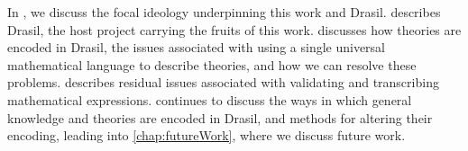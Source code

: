 In , we discuss the focal ideology underpinning this work
and Drasil.  describes Drasil, the host project carrying the
fruits of this work.  discusses how theories are encoded
in Drasil, the issues associated with using a single universal mathematical
language to describe theories, and how we can resolve these problems.
 describes residual issues associated with validating and
transcribing mathematical expressions.  continues to
discuss the ways in which general knowledge and theories are encoded in Drasil,
and methods for altering their encoding, leading into \cref{chap:futureWork},
where we discuss future work.
